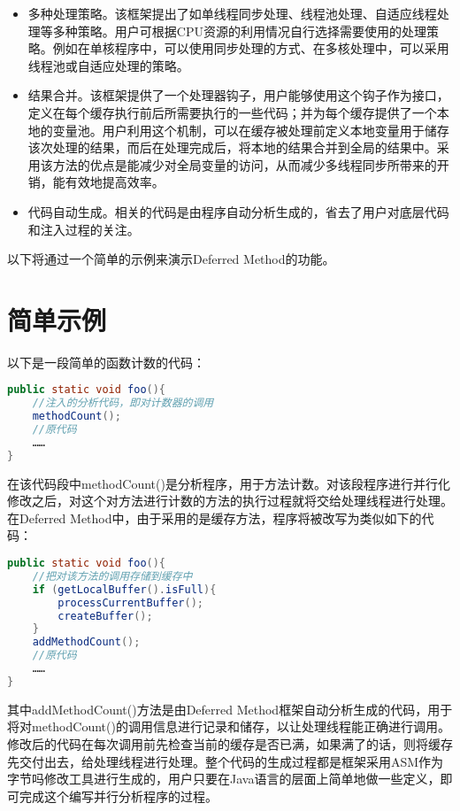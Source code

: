 \begin{itemize}
	\item 多种处理策略。该框架提出了如单线程同步处理、线程池处理、自适应线程处理等多种策略。用户可根据CPU资源的利用情况自行选择需要使用的处理策略。例如在单核程序中，可以使用同步处理的方式、在多核处理中，可以采用线程池或自适应处理的策略。
	\item 结果合并。该框架提供了一个处理器钩子，用户能够使用这个钩子作为接口，定义在每个缓存执行前后所需要执行的一些代码；并为每个缓存提供了一个本地的变量池。用户利用这个机制，可以在缓存被处理前定义本地变量用于储存该次处理的结果，而后在处理完成后，将本地的结果合并到全局的结果中。采用该方法的优点是能减少对全局变量的访问，从而减少多线程同步所带来的开销，能有效地提高效率。
	\item 代码自动生成。相关的代码是由程序自动分析生成的，省去了用户对底层代码和注入过程的关注。
\end{itemize}

以下将通过一个简单的示例来演示Deferred Method的功能。

\section{简单示例}

以下是一段简单的函数计数的代码：

\begin{lstlisting}[language=Java]
public static void foo(){
	//注入的分析代码，即对计数器的调用
	methodCount();
	//原代码
	……
}
\end{lstlisting}

在该代码段中methodCount()是分析程序，用于方法计数。对该段程序进行并行化修改之后，对这个对方法进行计数的方法的执行过程就将交给处理线程进行处理。在Deferred Method中，由于采用的是缓存方法，程序将被改写为类似如下的代码：

\begin{lstlisting}[language=Java]
public static void foo(){
	//把对该方法的调用存储到缓存中
	if (getLocalBuffer().isFull){
		processCurrentBuffer();
		createBuffer();
	}
	addMethodCount();
	//原代码
	……
}
\end{lstlisting}

其中addMethodCount()方法是由Deferred Method框架自动分析生成的代码，用于将对methodCount()的调用信息进行记录和储存，以让处理线程能正确进行调用。修改后的代码在每次调用前先检查当前的缓存是否已满，如果满了的话，则将缓存先交付出去，给处理线程进行处理。整个代码的生成过程都是框架采用ASM作为字节吗修改工具进行生成的，用户只要在Java语言的层面上简单地做一些定义，即可完成这个编写并行分析程序的过程。

